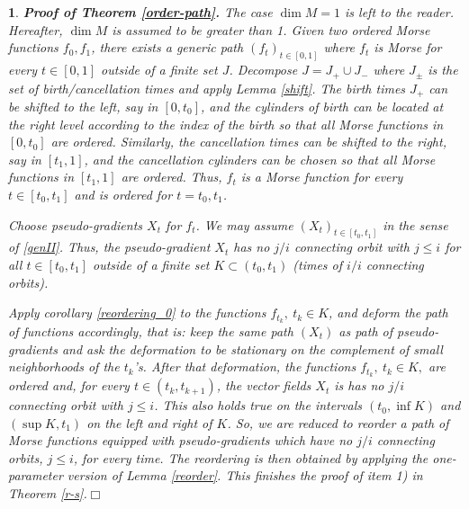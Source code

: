 \documentclass[12pt]{amsart}
\newtheorem{rien}[thm]{}
\def\bull{\hfill$\Box$\\}
\begin{document}
\begin{rien}{\rm {\bf Proof of Theorem \ref{order-path}.} The case $\dim M=1$
is left to the reader. Hereafter, $\dim M$ is assumed to be greater than 1. Given two ordered Morse functions
$f_0,f_1$, there exists a generic path $(f_t)_{t\in[0,1]}$ where $f_t$ is Morse 
for every $t\in [0,1]$ outside of a finite set $J$. 
Decompose $J= J_+\cup J_-$ where $J_\pm$ is the set of birth/cancellation times and apply
Lemma \ref{shift}.  The birth times $J_+$ can be shifted to the left, say in $[0,t_0]$,
and the cylinders
of birth can be located at the right level according to the index of the birth
so that all Morse functions in $[0,t_0]$ are ordered.
Similarly,  the cancellation times can be shifted to the right, say in $[t_1,1]$, and the cancellation cylinders can be chosen so that all Morse functions in $[t_1,1]$ are ordered.
Thus, $f_t$ is a Morse function for every $t\in [t_0,t_1]$ and is ordered for $t=t_0,t_1$.

  Choose  pseudo-gradients  $X_t$ for $f_t$.
 We may assume   $(X_t)_{t\in [t_0,t_1]}$   %
 in the sense of \ref{genII}. Thus,  the pseudo-gradient $X_t$ has no $j/i$ connecting orbit with $j\leq i$
for all $t\in [t_0,t_1]$ outside of  a finite set $K\subset (t_0,t_1)$ (times of $i/i$ connecting orbits). 


Apply corollary \ref{reordering_0} to the functions $f_{t_k}, \ t_k\in K$, and deform the path of functions accordingly, that is: keep the same path $\left(X_t\right)$ as path of pseudo-gradients
and ask the deformation to be 
 stationary on the complement of small neighborhoods of the $t_k$'s.
 After that deformation,
the functions $f_{t_k}, \ t_k\in K,$ are ordered and, for every  $t\in (t_k,t_{k+1})$,
the vector fields $X_t$ is %
has no   $j/i$ connecting orbit with $j\leq i$. This   also holds true on the intervals
$(t_0,\inf K)$ and $(\sup K, t_1)$
on the left and right  of $K$. So, we are
reduced to reorder a path of  Morse functions  equipped with pseudo-gradients which 
have no $j/i$ connecting orbits, $j\leq i$,  for every time. The reordering is then 
 obtained by applying the one-parameter version of 
 Lemma \ref{reorder}. This finishes the proof of item 1) in Theorem \ref{r-s}.\bull
}\end{rien}
\end{document}
